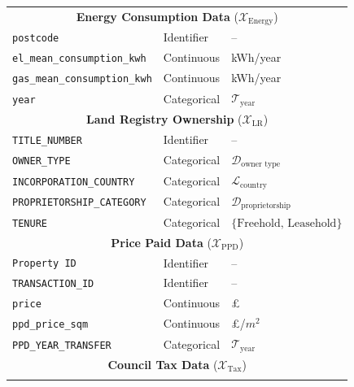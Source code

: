 \documentclass[12pt]{article}
\begin{document}
\begin{longtable}{@{} p{} p{} p{} @{}}
\midrule
\multicolumn{3}{c}{\cellcolor{gray!10}\textbf{Energy Consumption Data} ($\mathcal{X}_{\text{Energy}}$)} \\
\addlinespace[0.5em]

\texttt{postcode} & Identifier & -- \\
\addlinespace
\texttt{el\_mean\_consumption\_kwh} & Continuous & kWh/year \\
\texttt{gas\_mean\_consumption\_kwh} & Continuous & kWh/year \\
\addlinespace
\texttt{year} & Categorical & $\mathcal{T}_{\text{year}}$ \\

\midrule
\multicolumn{3}{c}{\cellcolor{gray!10}\textbf{Land Registry Ownership} ($\mathcal{X}_{\text{LR}}$)} \\
\addlinespace[0.5em]

\texttt{TITLE\_NUMBER} & Identifier & -- \\
\addlinespace
\texttt{OWNER\_TYPE} & Categorical & $\mathcal{D}_{\text{owner type}}$ \\
\texttt{INCORPORATION\_COUNTRY} & Categorical & $\mathcal{L}_{\text{country}}$ \\
\texttt{PROPRIETORSHIP\_CATEGORY} & Categorical & $\mathcal{D}_{\text{proprietorship}}$ \\
\texttt{TENURE} & Categorical & $\{\text{Freehold, Leasehold}\}$ \\

\midrule
\multicolumn{3}{c}{\cellcolor{gray!10}\textbf{Price Paid Data} ($\mathcal{X}_{\text{PPD}}$)} \\
\addlinespace[0.5em]

\texttt{Property ID} & Identifier & -- \\
\texttt{TRANSACTION\_ID} & Identifier & -- \\
\addlinespace
\texttt{price} & Continuous & £ \\
\texttt{ppd\_price\_sqm} & Continuous & £/$m^2$ \\
\addlinespace
\texttt{PPD\_YEAR\_TRANSFER} & Categorical & $\mathcal{T}_{\text{year}}$ \\

\midrule
\multicolumn{3}{c}{\cellcolor{gray!10}\textbf{Council Tax Data} ($\mathcal{X}_{\text{Tax}}$)} \\
\addlinespace[0.5em]


\end{longtable}
\end{document}
